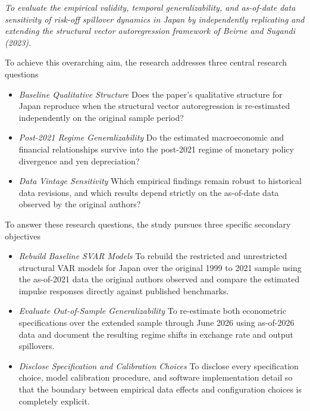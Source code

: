 \vspace{1em}
\noindent\textit{To evaluate the empirical validity, temporal generalizability, and as-of-date data sensitivity of risk-off spillover dynamics in Japan by independently replicating and extending the structural vector autoregression framework of Beirne and Sugandi (2023).}
\vspace{1em}

To achieve this overarching aim, the research addresses three central research questions

\begin{itemize}
    \item \textit{Baseline Qualitative Structure}
\newline Does the paper's qualitative structure for Japan reproduce when the structural vector autoregression is re-estimated independently on the original sample period?
    \item \textit{Post-2021 Regime Generalizability}
\newline Do the estimated macroeconomic and financial relationships survive into the post-2021 regime of monetary policy divergence and yen depreciation?
    \item \textit{Data Vintage Sensitivity}
\newline Which empirical findings remain robust to historical data revisions, and which results depend strictly on the as-of-date data observed by the original authors?
\end{itemize}

To answer these research questions, the study pursues three specific secondary objectives

\begin{itemize}
    \item \textit{Rebuild Baseline SVAR Models}
\newline To rebuild the restricted and unrestricted structural VAR models for Japan over the original 1999 to 2021 sample using the as-of-2021 data the original authors observed and compare the estimated impulse responses directly against published benchmarks.
    \item \textit{Evaluate Out-of-Sample Generalizability}
\newline To re-estimate both econometric specifications over the extended sample through June 2026 using as-of-2026 data and document the resulting regime shifts in exchange rate and output spillovers.
    \item \textit{Disclose Specification and Calibration Choices}
\newline To disclose every specification choice, model calibration procedure, and software implementation detail so that the boundary between empirical data effects and configuration choices is completely explicit.
\end{itemize}

